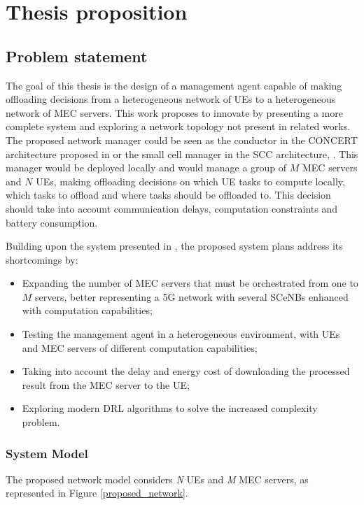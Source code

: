 \chapter{Thesis proposition}

\section{Problem statement}
\noindent The goal of this thesis is the design of a management agent capable of making offloading decisions from a heterogeneous network of \acrshort{UE}s to a heterogeneous network of \acrshort{MEC} servers. This work proposes to innovate by presenting a more complete system and exploring a network topology not present in related works. The proposed network manager could be seen as the conductor in the CONCERT architecture proposed in \cite{CONCERT} or the small cell manager in the \acrshort{SCC} architecture, \cite{SESAM}. This manager would be deployed locally and would manage a group of $M$ \acrshort{MEC} servers and $N$ \acrshort{UE}s, making offloading decisions on which \acrshort{UE} tasks to compute locally, which tasks to offload and where tasks should be offloaded to. This decision should take into account communication delays, computation constraints and battery consumption.

Building upon the system presented in \cite{NUE1mec}, the proposed system plans address its shortcomings by:
\begin{itemize}
    \item Expanding the number of \acrshort{MEC} servers that must be orchestrated from one to $M$ servers, better representing a 5G network with several \acrshort{SCeNBs} enhanced with computation capabilities;
    \item Testing the management agent in a heterogeneous environment, with \acrshort{UE}s and \acrshort{MEC} servers of different computation capabilities;
    \item Taking into account the delay and energy cost of downloading the processed result from the \acrshort{MEC} server to the \acrshort{UE};
    \item Exploring modern \acrshort{DRL} algorithms to solve the increased complexity problem.
\end{itemize}

\subsection{System Model}
\noindent The proposed network model considers \emph{N} \acrshort{UE}s and \emph{M} \acrshort{MEC} servers, as represented in Figure \ref{proposed_network}. 

